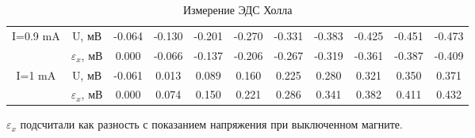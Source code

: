 \documentclass[a4paper, 12pt]{article}%
\begin{document}
\begin{table}[H]
\begin{tabular}{|c|c|c|c|c|c|c|c|c|c|c|}
			\multirow{2}{*}{I=0.9 mA}  & U, мВ               & -0.064 & -0.130 & -0.201 & -0.270 & -0.331 & -0.383 & -0.425 & -0.451 & -0.473 \\ \cline{2-11} 
			& $\varepsilon_x$, мВ & 0.000  & -0.066 & -0.137 & -0.206 & -0.267 & -0.319 & -0.361 & -0.387 & -0.409 \\ \hline
			\multirow{2}{*}{I=1 mA} & U, мВ               & -0.061 & 0.013  & 0.089  & 0.160  & 0.225  & 0.280  & 0.321  & 0.350  & 0.371  \\ \cline{2-11} 
			& $\varepsilon_x$, мВ & 0.000  & 0.074  & 0.150  & 0.221  & 0.286  & 0.341  & 0.382  & 0.411  & 0.432  \\ \hline
		\end{tabular}
		\caption{Измерение ЭДС Холла}
	\end{table}
	$\varepsilon_x$ подсчитали как разность с показанием напряжения при выключенном магните.\\
\end{document}
